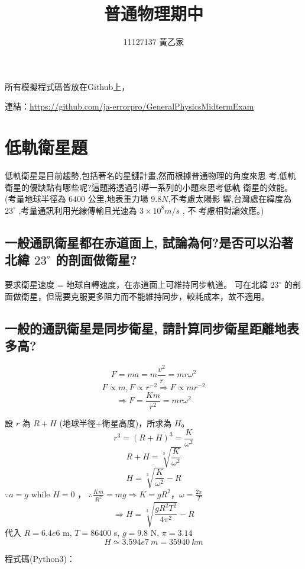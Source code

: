 \documentclass[UTF8,a4paper,12pt]{article}
\title{\fontsize{18pt}{\baselineskip} \textbf{普通物理期中}}
\author{\fontsize{16pt}{\baselineskip}11127137 黃乙家}
\date{}
\begin{document}
\maketitle

\fontsize{12pt}{\baselineskip}

所有模擬程式碼皆放在Github上，

連結：\url{https://github.com/ja-errorpro/GeneralPhysicsMidtermExam}

\section{低軌衛星題}

低軌衛星是目前趨勢,包括著名的星鏈計畫,然而根據普通物理的角度來思
考,低軌衛星的優缺點有哪些呢?這題將透過引導一系列的小題來思考低軌
衛星的效能。(考量地球半徑為 $6400$ 公里,地表重力場 $9.8 N$,不考慮太陽影
響,台灣處在緯度為 $ 23^\circ $ ,考量通訊利用光線傳輸且光速為 $ 3 \times 10^8 m/s $ , 不
考慮相對論效應。)

\subsection{一般通訊衛星都在赤道面上, 試論為何?是否可以沿著北緯 \texorpdfstring{$ 23^\circ $}{23} 的剖面做衛星?}

要求衛星速度 = 地球自轉速度，在赤道面上可維持同步軌道。
可在北緯 $ 23^\circ $ 的剖面做衛星，但需要克服更多阻力而不能維持同步，較耗成本，故不適用。

\subsection{一般的通訊衛星是同步衛星, 請計算同步衛星距離地表多高?}

$$ F = ma = m \frac{v^2}{r} = mr\omega^2 $$
$$ F \propto m ,  F \propto r^{-2} \Rightarrow F \propto mr^{-2} $$
$$ \Rightarrow F = \frac{Km}{r^2} = mr\omega^2 $$

\newpage

設 $r$ 為 $R + H$ (地球半徑+衛星高度)，所求為 $H$。
$$ r^3 = (R+H)^3 = \frac{K}{\omega^2}  $$
$$ R + H = \sqrt[3]{\frac{K}{\omega^2}} $$
$$ H = \sqrt[3]{\frac{K}{\omega^2}} - R $$
$ \because a = g $ while $H = 0$ ， $\therefore \frac{Km}{R^2} = mg \Rightarrow K = gR^2 $，$\omega = \frac{2\pi}{T}$
$$ \Rightarrow H = \sqrt[3]{\frac{gR^2T^2}{4\pi^2}} - R $$
代入 $R = 6.4e6 $ m, $T = 86400$ s, $g = 9.8$ N, $\pi = 3.14$
$$ H \simeq 3.594e7\ m = 35940\ km$$

程式碼(Python3)：
\end{document}
